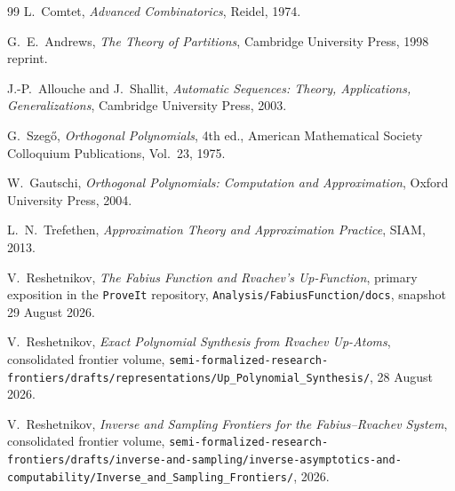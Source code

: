 \documentclass[11pt]{article}
\theoremstyle{definition}
\theoremstyle{remark}
\newcommand{\repo}{\nolinkurl{Analysis/FabiusFunction/docs}}
\begin{document}
\begin{thebibliography}{99}
L.~Comtet,
\newblock \emph{Advanced Combinatorics},
\newblock Reidel, 1974.

G.~E.~Andrews,
\newblock \emph{The Theory of Partitions},
\newblock Cambridge University Press, 1998 reprint.

J.-P.~Allouche and J.~Shallit,
\newblock \emph{Automatic Sequences: Theory, Applications, Generalizations},
\newblock Cambridge University Press, 2003.

G.~Szeg\H{o},
\newblock \emph{Orthogonal Polynomials}, 4th ed.,
\newblock American Mathematical Society Colloquium Publications, Vol.~23,
1975.

W.~Gautschi,
\newblock \emph{Orthogonal Polynomials: Computation and Approximation},
\newblock Oxford University Press, 2004.

L.~N.~Trefethen,
\newblock \emph{Approximation Theory and Approximation Practice},
\newblock SIAM, 2013.

V.~Reshetnikov,
\newblock \emph{The Fabius Function and Rvachev's Up-Function},
\newblock primary exposition in the \texttt{ProveIt} repository,
\repo, snapshot 29 August 2026.

V.~Reshetnikov,
\newblock \emph{Exact Polynomial Synthesis from Rvachev Up-Atoms},
\newblock consolidated frontier volume,
\nolinkurl{semi-formalized-research-frontiers/drafts/representations/Up_Polynomial_Synthesis/},
28 August 2026.

V.~Reshetnikov,
\newblock \emph{Inverse and Sampling Frontiers for the Fabius--Rvachev System},
\newblock consolidated frontier volume,
\nolinkurl{semi-formalized-research-frontiers/drafts/inverse-and-sampling/inverse-asymptotics-and-computability/Inverse_and_Sampling_Frontiers/},
2026.

\end{thebibliography}
\end{document}
